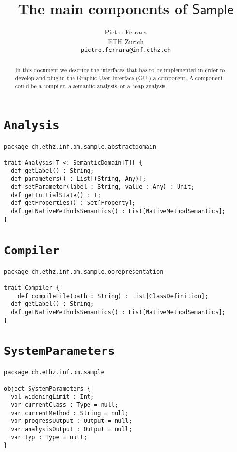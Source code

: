 \documentclass[11pt]{article}
\newcommand{\ScalaAnalyzer}{\ensuremath{\mathsf{Sample}}}
\newcommand{\statement}[1]{\lstinline{#1}}
\begin{document}
\title{The main components of \ScalaAnalyzer}

\author{
Pietro Ferrara\\
ETH Zurich\\
\texttt{pietro.ferrara@inf.ethz.ch}
}

\maketitle

\begin{abstract}
In this document we describe the interfaces that has to be implemented in order to develop and plug in the Graphic User Interface (GUI) a component. A component could be a compiler, a semantic analysis, or a heap analysis.
\end{abstract}


\section{\statement{Analysis}}
\begin{lstlisting}
package ch.ethz.inf.pm.sample.abstractdomain

trait Analysis[T <: SemanticDomain[T]] {
  def getLabel() : String;
  def parameters() : List[(String, Any)];
  def setParameter(label : String, value : Any) : Unit;
  def getInitialState() : T;
  def getProperties() : Set[Property];
  def getNativeMethodsSemantics() : List[NativeMethodSemantics];
}
\end{lstlisting}

\section{\statement{Compiler}}
\begin{lstlisting}
package ch.ethz.inf.pm.sample.oorepresentation

trait Compiler {
	def compileFile(path : String) : List[ClassDefinition];
  def getLabel() : String;
  def getNativeMethodsSemantics() : List[NativeMethodSemantics];
}
\end{lstlisting}

\section{\statement{SystemParameters}}
\begin{lstlisting}
package ch.ethz.inf.pm.sample

object SystemParameters {
  val wideningLimit : Int;
  var currentClass : Type = null;
  var currentMethod : String = null;
  var progressOutput : Output = null;
  var analysisOutput : Output = null;
  var typ : Type = null;
}
\end{lstlisting}
\end{document}

